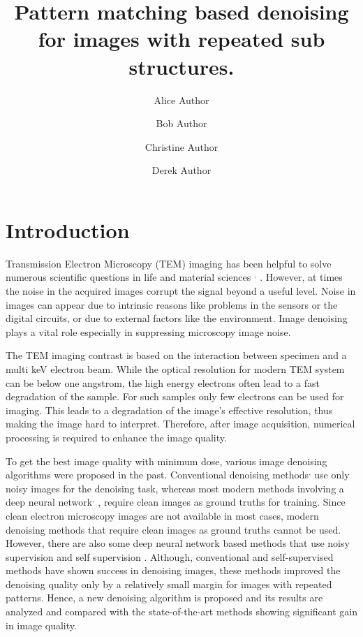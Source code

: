 \documentclass[fleqn,10pt]{wlscirep}
\title{Pattern matching based denoising for images with repeated sub structures.}
\author[1,*]{Alice Author}
\author[2]{Bob Author}
\author[1,2,+]{Christine Author}
\author[2,+]{Derek Author}
\affil[1]{Affiliation, department, city, postcode, country}
\affil[2]{Affiliation, department, city, postcode, country}
\affil[*]{corresponding.author@email.example}
\affil[+]{these authors contributed equally to this work}
\begin{document}
	
	\flushbottom
	\maketitle
	\thispagestyle{empty}
	
	\section*{Introduction}
	
	Transmission Electron Microscopy (TEM) imaging has been helpful to solve numerous scientific questions in life and material sciences \cite{CURRY200691}$^{,}$\cite{WANG2008395} . However, at times the noise in the acquired images corrupt the signal beyond a useful level. Noise in images can appear due to intrinsic reasons like problems in the sensors or the digital circuits, or due to external factors like the environment. Image denoising plays a vital role especially in suppressing microscopy image noise.
	
	The TEM imaging contrast is based on the interaction between specimen and a multi keV electron beam. While the optical resolution for modern TEM system can be below one angstrom, the high energy electrons often lead to a fast degradation of the sample. For such samples only few electrons can be used for imaging. This leads to a degradation of the image's effective resolution, thus making the image hard to interpret. Therefore, after image acquisition, numerical processing is required to enhance the image quality.
	
	To get the best image quality with minimum dose, various image denoising algorithms were proposed in the past. Conventional denoising methods\cite{bcm_nlm}$^{,}$ \cite{DBLP:journals/tip/BM3D} use only noisy images for the denoising task, whereas most modern methods involving a deep neural network\cite{zhang2018ffdnet}$^{,}$ \cite{zhang2017beyond}, require clean images as ground truths for training. Since clean electron microscopy images are not available in most cases, modern denoising methods that require clean images as ground truths cannot be used. However, there are also some deep neural network based methods that use noisy supervision\cite{DBLP:journals/corr/abs-1803-04189} and self supervision\cite{krull2019noise2void} . Although, conventional and self-supervised methods have shown success in denoising images, these methods improved the denoising quality only by a relatively small margin for images with repeated patterns. Hence, a new denoising algorithm is proposed and its results are analyzed and compared with the state-of-the-art methods showing significant gain in image quality. 
	
\end{document}
